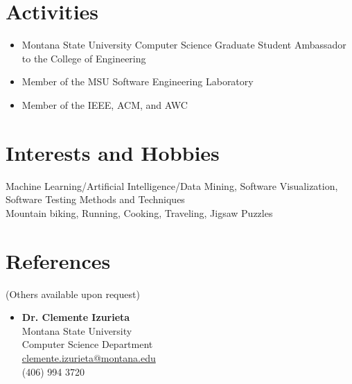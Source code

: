 \documentclass[a4paper,10pt]{article} %
\begin{document}
\section{Activities}
\begin{itemize}
\item{Montana State University Computer Science Graduate Student Ambassador to the College of Engineering}
\item{Member of the MSU Software Engineering Laboratory}
\item{Member of the IEEE, ACM, and AWC}
\end{itemize}


\section{Interests and Hobbies}

Machine Learning/Artificial Intelligence/Data Mining, Software Visualization, Software Testing Methods and Techniques\\
Mountain biking, Running, Cooking, Traveling, Jigsaw Puzzles\\

\section{References}
(Others available upon request)
\begin{itemize}
\item{\textbf{Dr. Clemente Izurieta}\\Montana State University\\Computer Science Department\\\href{mailto:clemente.izurieta@montana.edu}{clemente.izurieta@montana.edu}\\(406) 994 3720}\
\end{itemize}\
\end{document}
